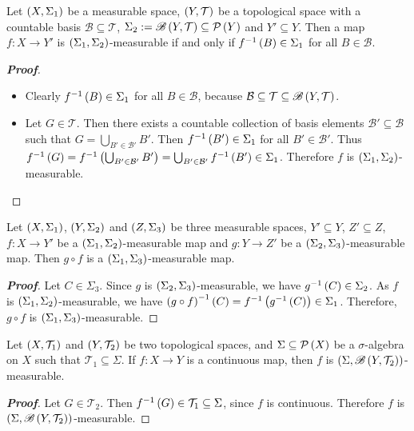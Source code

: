 \begin{proposition}
  Let $\left(X,\Sigma_1\right)$ be a measurable space, $\left(Y,\mathcal{T}\right)$ be a topological space with a countable basis $\mathcal{B}\subseteq\mathcal{T}$, $\Sigma_2:=\mathscr{B}\left(Y,\mathcal{T}\right)\subseteq\mathcal{P}\left(Y\right)$ and $Y'\subseteq Y$. Then a map $f:X\rightarrow Y'$ is $\left(\Sigma_1,\Sigma_2\right)$-measurable if and only if $f^{-1}\left(B\right)\in\Sigma_1$ for all $B\in\mathcal{B}$.
  \begin{proof}[\rm\textbf{Proof}]
    \hfill
    \begin{itemize}
      \item[\boxed{\Rightarrow}] Clearly $f^{-1}\left(B\right)\in\Sigma_1$ for all $B\in\mathcal{B}$, because $\mathcal{B}\subseteq\mathcal{T}\subseteq\mathscr{B}\left(Y,\mathcal{T}\right)$.
      \item[\boxed{\Leftarrow}] Let $G\in\mathcal{T}$. Then there exists a countable collection of basis elements $\mathcal{B}'\subseteq\mathcal{B}$ such that $G=\bigcup_{B'\in\mathcal{B}'}{B'}$. Then $f^{-1}\left(B'\right)\in\Sigma_1$ for all $B'\in\mathcal{B}'$. Thus $f^{-1}\left(G\right)=f^{-1}\left(\bigcup_{B'\in\mathcal{B}'}{B'}\right)=\bigcup_{B'\in\mathcal{B}'}{f^{-1}\left(B'\right)}\in\Sigma_1$. Therefore $f$ is $\left(\Sigma_1,\Sigma_2\right)$-measurable.
    \end{itemize}
  \end{proof}
\end{proposition}

\begin{proposition}
  Let $\left(X,\Sigma_1\right)$, $\left(Y,\Sigma_2\right)$ and $\left(Z,\Sigma_3\right)$ be three measurable spaces, $Y'\subseteq Y$, $Z'\subseteq Z$, $f:X\rightarrow Y'$ be a $\left(\Sigma_1,\Sigma_2\right)$-measurable map and $g:Y\rightarrow Z'$ be a $\left(\Sigma_2,\Sigma_3\right)$-measurable map. Then $g\circ f$ is a $\left(\Sigma_1,\Sigma_3\right)$-measurable map.
  \begin{proof}[\rm\textbf{Proof}]
    Let $C\in\Sigma_3$. Since $g$ is $\left(\Sigma_2,\Sigma_3\right)$-measurable, we have $g^{-1}\left(C\right)\in\Sigma_2$. As $f$ is $\left(\Sigma_1,\Sigma_2\right)$-measurable, we have $\left(g\circ f\right)^{-1}\left(C\right)=f^{-1}\left(g^{-1}\left(C\right)\right)\in\Sigma_1$. Therefore, $g\circ f$ is $\left(\Sigma_1,\Sigma_3\right)$-measurable.
  \end{proof}
\end{proposition}

\begin{proposition}
  Let $\left(X,\mathcal{T}_1\right)$ and $\left(Y,\mathcal{T}_2\right)$ be two topological spaces, and $\Sigma\subseteq\mathcal{P}\left(X\right)$ be a $\sigma$-algebra on $X$ such that $\mathcal{T}_1\subseteq\Sigma$. If $f:X\rightarrow Y$ is a continuous map, then $f$ is $\left(\Sigma,\mathscr{B}\left(Y,\mathcal{T}_2\right)\right)$-measurable.
  \begin{proof}[\rm\textbf{Proof}]
    Let $G\in\mathcal{T}_2$. Then $f^{-1}\left(G\right)\in\mathcal{T}_1\subseteq\Sigma$, since $f$ is continuous. Therefore $f$ is $\left(\Sigma,\mathscr{B}\left(Y,\mathcal{T}_2\right)\right)$-measurable.
  \end{proof}
\end{proposition}

